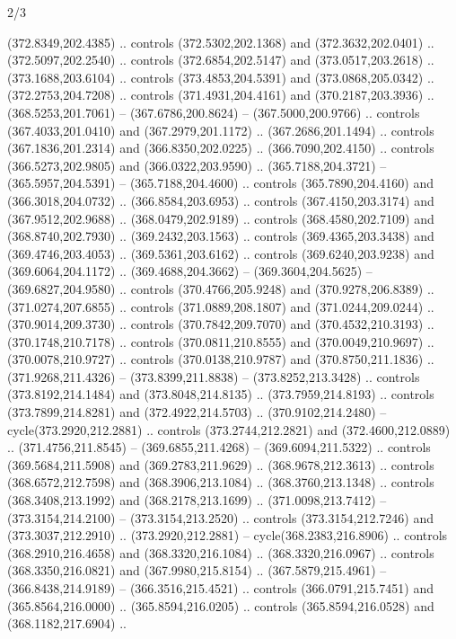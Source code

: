 \begin{flagdescription}{2/3}
\begin{scope}[xshift=0.5\flaglength,yshift=0.5\flagwidth,scale=\flagwidth/495.65]
\begin{scope}[y=0.8pt, x=0.8pt, yscale=-1,shift={(-463.76,-309.78)}]
  (372.8349,202.4385) .. controls (372.5302,202.1368) and (372.3632,202.0401) ..
  (372.5097,202.2540) .. controls (372.6854,202.5147) and (373.0517,203.2618) ..
  (373.1688,203.6104) .. controls (373.4853,204.5391) and (373.0868,205.0342) ..
  (372.2753,204.7208) .. controls (371.4931,204.4161) and (370.2187,203.3936) ..
  (368.5253,201.7061) -- (367.6786,200.8624) -- (367.5000,200.9766) .. controls
  (367.4033,201.0410) and (367.2979,201.1172) .. (367.2686,201.1494) .. controls
  (367.1836,201.2314) and (366.8350,202.0225) .. (366.7090,202.4150) .. controls
  (366.5273,202.9805) and (366.0322,203.9590) .. (365.7188,204.3721) --
  (365.5957,204.5391) -- (365.7188,204.4600) .. controls (365.7890,204.4160) and
  (366.3018,204.0732) .. (366.8584,203.6953) .. controls (367.4150,203.3174) and
  (367.9512,202.9688) .. (368.0479,202.9189) .. controls (368.4580,202.7109) and
  (368.8740,202.7930) .. (369.2432,203.1563) .. controls (369.4365,203.3438) and
  (369.4746,203.4053) .. (369.5361,203.6162) .. controls (369.6240,203.9238) and
  (369.6064,204.1172) .. (369.4688,204.3662) -- (369.3604,204.5625) --
  (369.6827,204.9580) .. controls (370.4766,205.9248) and (370.9278,206.8389) ..
  (371.0274,207.6855) .. controls (371.0889,208.1807) and (371.0244,209.0244) ..
  (370.9014,209.3730) .. controls (370.7842,209.7070) and (370.4532,210.3193) ..
  (370.1748,210.7178) .. controls (370.0811,210.8555) and (370.0049,210.9697) ..
  (370.0078,210.9727) .. controls (370.0138,210.9787) and (370.8750,211.1836) ..
  (371.9268,211.4326) -- (373.8399,211.8838) -- (373.8252,213.3428) .. controls
  (373.8192,214.1484) and (373.8048,214.8135) .. (373.7959,214.8193) .. controls
  (373.7899,214.8281) and (372.4922,214.5703) .. (370.9102,214.2480) --
  cycle(373.2920,212.2881) .. controls (373.2744,212.2821) and
  (372.4600,212.0889) .. (371.4756,211.8545) -- (369.6855,211.4268) --
  (369.6094,211.5322) .. controls (369.5684,211.5908) and (369.2783,211.9629) ..
  (368.9678,212.3613) .. controls (368.6572,212.7598) and (368.3906,213.1084) ..
  (368.3760,213.1348) .. controls (368.3408,213.1992) and (368.2178,213.1699) ..
  (371.0098,213.7412) -- (373.3154,214.2100) -- (373.3154,213.2520) .. controls
  (373.3154,212.7246) and (373.3037,212.2910) .. (373.2920,212.2881) --
  cycle(368.2383,216.8906) .. controls (368.2910,216.4658) and
  (368.3320,216.1084) .. (368.3320,216.0967) .. controls (368.3350,216.0821) and
  (367.9980,215.8154) .. (367.5879,215.4961) -- (366.8438,214.9189) --
  (366.3516,215.4521) .. controls (366.0791,215.7451) and (365.8564,216.0000) ..
  (365.8594,216.0205) .. controls (365.8594,216.0528) and (368.1182,217.6904) ..

\end{scope}
\end{scope}
\end{flagdescription}
